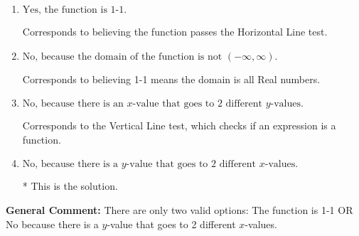 \documentclass{extbook}[14pt]
\begin{document}
\begin{enumerate}
{\begin{enumerate}[label=\Alph*.]
Corresponds to believing 1-1 means the range is all Real numbers.
\item \( \text{Yes, the function is 1-1.} \)

Corresponds to believing the function passes the Horizontal Line test.
\item \( \text{No, because the domain of the function is not $(-\infty, \infty)$.} \)

Corresponds to believing 1-1 means the domain is all Real numbers.
\item \( \text{No, because there is an $x$-value that goes to 2 different $y$-values.} \)

Corresponds to the Vertical Line test, which checks if an expression is a function.
\item \( \text{No, because there is a $y$-value that goes to 2 different $x$-values.} \)

* This is the solution.
\end{enumerate}

\textbf{General Comment:} There are only two valid options: The function is 1-1 OR No because there is a $y$-value that goes to 2 different $x$-values.
}
\end{enumerate}
\end{document}
